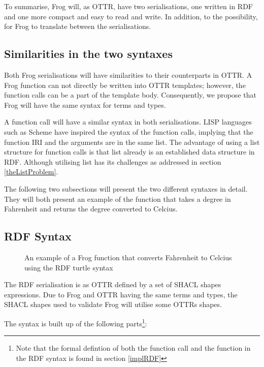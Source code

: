 \para
To summarise, Frog will, as OTTR, have two serialisations, one written in RDF and one more compact and easy to read and write. In addition, to the possibility, for Frog to translate between the serialisations.

\subsection{Similarities in the two syntaxes}
Both Frog serialisations will have similarities to their counterparts in OTTR. A Frog function can not directly be written into OTTR templates; however, the function calls can be a part of the template body. Consequently, we propose that Frog will have the same syntax for terms and types. 

\para 
A function call will have a similar syntax in both serialisations. LISP languages such as Scheme have inspired the syntax of the function calls, implying that the function IRI and the arguments are in the same list. The advantage of using a list structure for function calls is that list already is an established data structure in RDF. Although utilising list has its challenges as addressed in section \ref{theListProblem}.

\para 
The following two subsections will present the two different syntaxes in detail. They will both present an example of the function that takes a degree in Fahrenheit and returns the degree converted to Celcius. 

\subsection{RDF Syntax}
\label{RDF_syntax}

\begin{figure}[b]
    
    \caption{An example of a Frog function that converts Fahrenheit to Celcius using the RDF turtle syntax}
    \label{fig:rdf_example}
\end{figure}

\para
The RDF serialisation is as OTTR defined by a set of SHACL shapes expressions. Due to Frog and OTTR having the same terms and types, the SHACL shapes used to validate Frog will utilise some OTTRs shapes. 

\para
The syntax is built up of the following parts\footnote{Note that the formal defintion of both the function call and the function in the RDF syntax is found in section \ref{implRDF}}: 

